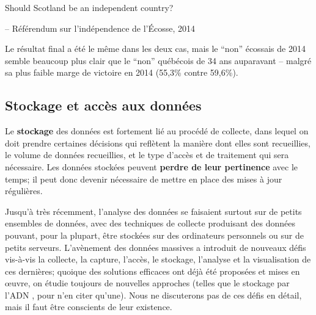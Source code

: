 \begin{tcolorbox}[title=Do You Think They Learned Something From 1980?]
Should Scotland be an independent country? \\[-0.6cm]
\begin{flushright}
-- R\'ef\'erendum sur l'ind\'ependence de l'\'Ecosse, 2014
\end{flushright}
\end{tcolorbox}
\noindent Le résultat final a été le même dans les deux cas, mais le ``non'' écossais de 2014 semble  beaucoup plus clair que le ``non'' québécois de 34 ans auparavant -- malgré sa plus faible marge de victoire en 2014 (55,3\% contre 59,6\%). 
\subsection{Stockage et accès aux données}
Le \textbf{stockage} des données est fortement lié au procédé de collecte, dans lequel on doit prendre certaines décisions qui reflètent la manière dont elles sont recueillies, le volume de données recueillies, et le type d'accès et de traitement qui sera nécessaire. Les données stockées peuvent \textbf{perdre de leur pertinence} avec le temps; il peut donc devenir nécessaire de mettre en place des mises à jour régulières. 
\par
Jusqu'à très récemment, l'analyse des données se faisaient surtout sur de petits ensembles de données, avec des techniques de collecte produisant des données pouvant, pour la plupart, être stockées sur des ordinateurs personnels ou sur de petits serveurs. L'avènement des données massives a introduit de nouveaux défis vis-\`a-vis la collecte, la capture, l'accès, le stockage, l'analyse et la visualisation de ces dernières; quoique des  solutions efficaces ont déjà été proposées et mises en œuvre, on étudie toujours de nouvelles approches (telles que le stockage par l'ADN \cite{DC_DNA}, pour n'en citer qu'une). Nous ne discuterons pas de ces défis en détail, mais il faut être conscients de leur existence.  
